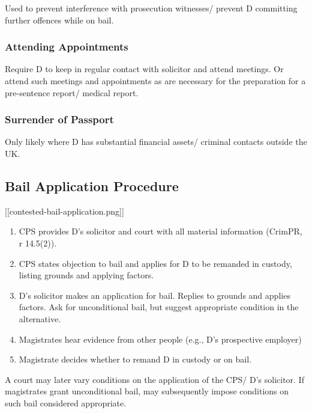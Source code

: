 \documentclass[
]{article}
\providecommand{\tightlist}{%
  \setlength{\itemsep}{0pt}\setlength{\parskip}{0pt}}
\begin{document}
Used to prevent interference with prosecution witnesses/ prevent D
committing further offences while on bail.

\hypertarget{attending-appointments}{%
\subsubsection{Attending Appointments}\label{attending-appointments}}

Require D to keep in regular contact with solicitor and attend meetings.
Or attend such meetings and appointments as are necessary for the
preparation for a pre-sentence report/ medical report.

\hypertarget{surrender-of-passport}{%
\subsubsection{Surrender of Passport}\label{surrender-of-passport}}

Only likely where D has substantial financial assets/ criminal contacts
outside the UK.

\hypertarget{bail-application-procedure}{%
\subsection{Bail Application
Procedure}\label{bail-application-procedure}}

{[}{[}contested-bail-application.png{]}{]}

\begin{enumerate}
\def\labelenumi{\arabic{enumi}.}
\tightlist
\item
  CPS provides D's solicitor and court with all material information
  (CrimPR, r 14.5(2)).
\item
  CPS states objection to bail and applies for D to be remanded in
  custody, listing grounds and applying factors.
\item
  D's solicitor makes an application for bail. Replies to grounds and
  applies factors. Ask for unconditional bail, but suggest appropriate
  condition in the alternative.
\item
  Magistrates hear evidence from other people (e.g., D's prospective
  employer)
\item
  Magistrate decides whether to remand D in custody or on bail.
\end{enumerate}

A court may later vary conditions on the application of the CPS/ D's
solicitor. If magistrates grant unconditional bail, may subsequently
impose conditions on such bail considered appropriate.
\end{document}
